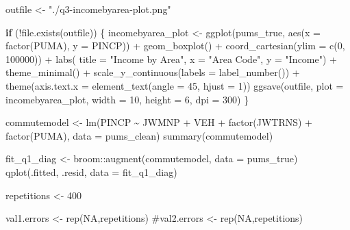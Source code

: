 \documentclass[
  letterpaper,
  DIV=11,
  numbers=noendperiod]{scrartcl}
\newenvironment{Shaded}{\begin{snugshade}}{\end{snugshade}}
\newcommand{\AttributeTok}[1]{\textcolor[rgb]{0.40,0.45,0.13}{#1}}
\newcommand{\CommentTok}[1]{\textcolor[rgb]{0.37,0.37,0.37}{#1}}
\newcommand{\ConstantTok}[1]{\textcolor[rgb]{0.56,0.35,0.01}{#1}}
\newcommand{\ControlFlowTok}[1]{\textcolor[rgb]{0.00,0.23,0.31}{\textbf{#1}}}
\newcommand{\DecValTok}[1]{\textcolor[rgb]{0.68,0.00,0.00}{#1}}
\newcommand{\FunctionTok}[1]{\textcolor[rgb]{0.28,0.35,0.67}{#1}}
\newcommand{\NormalTok}[1]{\textcolor[rgb]{0.00,0.23,0.31}{#1}}
\newcommand{\OtherTok}[1]{\textcolor[rgb]{0.00,0.23,0.31}{#1}}
\newcommand{\SpecialCharTok}[1]{\textcolor[rgb]{0.37,0.37,0.37}{#1}}
\newcommand{\StringTok}[1]{\textcolor[rgb]{0.13,0.47,0.30}{#1}}
\begin{document}
\begin{Shaded}
\begin{Highlighting}[]
\NormalTok{ outfile }\OtherTok{\textless{}{-}} \StringTok{"./q3{-}incomebyarea{-}plot.png"}

\ControlFlowTok{if}\NormalTok{ (}\SpecialCharTok{!}\FunctionTok{file.exists}\NormalTok{(outfile)) \{}
\NormalTok{  incomebyarea\_plot }\OtherTok{\textless{}{-}} \FunctionTok{ggplot}\NormalTok{(pums\_true, }\FunctionTok{aes}\NormalTok{(}\AttributeTok{x =} \FunctionTok{factor}\NormalTok{(PUMA), }\AttributeTok{y =}\NormalTok{ PINCP)) }\SpecialCharTok{+}
  \FunctionTok{geom\_boxplot}\NormalTok{() }\SpecialCharTok{+}
  \FunctionTok{coord\_cartesian}\NormalTok{(}\AttributeTok{ylim =} \FunctionTok{c}\NormalTok{(}\DecValTok{0}\NormalTok{, }\DecValTok{100000}\NormalTok{)) }\SpecialCharTok{+}
  \FunctionTok{labs}\NormalTok{(}
    \AttributeTok{title =} \StringTok{"Income by Area"}\NormalTok{,}
    \AttributeTok{x =} \StringTok{"Area Code"}\NormalTok{,}
    \AttributeTok{y =} \StringTok{"Income"}\NormalTok{) }\SpecialCharTok{+}
  \FunctionTok{theme\_minimal}\NormalTok{() }\SpecialCharTok{+}
  \FunctionTok{scale\_y\_continuous}\NormalTok{(}\AttributeTok{labels =} \FunctionTok{label\_number}\NormalTok{()) }\SpecialCharTok{+}
  \FunctionTok{theme}\NormalTok{(}\AttributeTok{axis.text.x =} \FunctionTok{element\_text}\NormalTok{(}\AttributeTok{angle =} \DecValTok{45}\NormalTok{, }\AttributeTok{hjust =} \DecValTok{1}\NormalTok{))}
  \FunctionTok{ggsave}\NormalTok{(outfile, }\AttributeTok{plot =}\NormalTok{ incomebyarea\_plot, }\AttributeTok{width =} \DecValTok{10}\NormalTok{, }\AttributeTok{height =} \DecValTok{6}\NormalTok{, }\AttributeTok{dpi =} \DecValTok{300}\NormalTok{)}
\NormalTok{\}}


\NormalTok{commutemodel }\OtherTok{\textless{}{-}} \FunctionTok{lm}\NormalTok{(PINCP }\SpecialCharTok{\textasciitilde{}}\NormalTok{ JWMNP }\SpecialCharTok{+}\NormalTok{ VEH }\SpecialCharTok{+} \FunctionTok{factor}\NormalTok{(JWTRNS) }\SpecialCharTok{+} \FunctionTok{factor}\NormalTok{(PUMA), }
  \AttributeTok{data =}\NormalTok{ pums\_clean)}
\FunctionTok{summary}\NormalTok{(commutemodel)}
  

\NormalTok{  fit\_q1\_diag }\OtherTok{\textless{}{-}}\NormalTok{ broom}\SpecialCharTok{::}\FunctionTok{augment}\NormalTok{(commutemodel, }\AttributeTok{data =}\NormalTok{ pums\_true)}
  \FunctionTok{qplot}\NormalTok{(.fitted, .resid, }\AttributeTok{data =}\NormalTok{ fit\_q1\_diag)}

\NormalTok{  repetitions }\OtherTok{\textless{}{-}} \DecValTok{400}
  
\NormalTok{  val1.errors }\OtherTok{\textless{}{-}} \FunctionTok{rep}\NormalTok{(}\ConstantTok{NA}\NormalTok{,repetitions)}
  \CommentTok{\#val2.errors \textless{}{-} rep(NA,repetitions)}


\end{Highlighting}
\end{Shaded}
\end{document}
